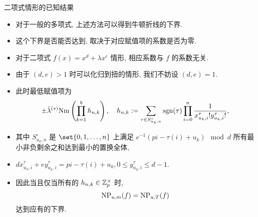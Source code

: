 \documentclass[aspectratio=169,handout]{ctexbeamer}
\begin{document}


\begin{frame}{二项式情形的已知结果}
	\begin{itemize}
		\item 对于一般的多项式, 上述方法可以得到牛顿折线的下界.
		\item 这个下界是否能否达到, 取决于对应赋值项的系数是否为零.
		\item 对于二项式 $f(x)=x^d+\lambda x^e$ 情形, 相应系数与 $f$ 的系数无关.
		\item 由于 $(d,e)>1$ 时可以化归到扭的情形, 我们不妨设 $(d,e)=1$.
		\item 此时最低赋值项为
		\[
			\pm\hat\lambda^{(*)}{\mathrm{Nm}}\left(\prod_{k=1}^b h_{n,k}\right),\quad
			h_{n,k}:=\sum_{\tau\in S_{u_k,n}^\circ}\operatorname{sgn}(\tau)\prod_{i=0}^n\frac{1}{x_{u_k,i}^\tau!y_{u_k,i}^\tau!},
		\]
		\item 其中 $S_{u_k,n}^\circ$ 是 $\set{0,1,\dots,n}$ 上满足 $e^{-1}(pi-\tau(i)+u_k)\mod d$ 所有最小非负剩余之和达到最小的置换全体,
		\item $dx_{u_k,i}^\tau+ey_{u_k,i}^\tau=pi-\tau(i)+u_k,0\le y_{u_k,i}^\tau\le d-1$.
		\item 因此当且仅当所有的 $h_{n,k}\in{\mathbb{Z}}_p^\times$ 时,
		\[
			{\mathrm{NP}}_{u,m}(f)={\mathrm{NP}}_{u,T}(f)
		\]
		达到应有的下界.
	\end{itemize}
\end{frame}
\end{document}
